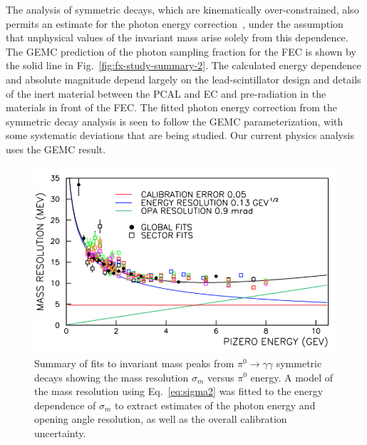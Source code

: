 The analysis of symmetric decays, which are kinematically over-constrained, also permits an estimate for the photon energy correction~\cite{2006015}, under the assumption that unphysical values of the invariant mass arise solely from this dependence.  The GEMC prediction of the photon sampling fraction for the FEC is shown by the solid line in Fig.~\ref{fig:fx-study-summary-2}.   The calculated energy dependence and absolute magnitude depend largely on the lead-scintillator design and details of the inert material between the PCAL and EC and pre-radiation in the materials in front of the FEC.  The fitted photon energy correction from the symmetric decay analysis is seen to follow the GEMC parameterization, with some systematic deviations that are being studied.  Our current physics analysis uses the GEMC result.


\begin{figure}[h]
\centering
\includegraphics[width=1.0\columnwidth,keepaspectratio]{img/fx-study-summary.png}
\caption[]{Summary of fits to invariant mass peaks from $\pi^0 \rightarrow \gamma \gamma$ symmetric decays showing the mass resolution $\sigma_m$ versus $\pi^0$ energy.  A model of the mass resolution using Eq.~\ref{eq:sigma2} was fitted to the energy dependence of $\sigma_m$ to extract estimates of the photon energy and opening angle resolution, as well as the overall calibration uncertainty.}
\label{fig:fx-study-summary}
\end{figure}

